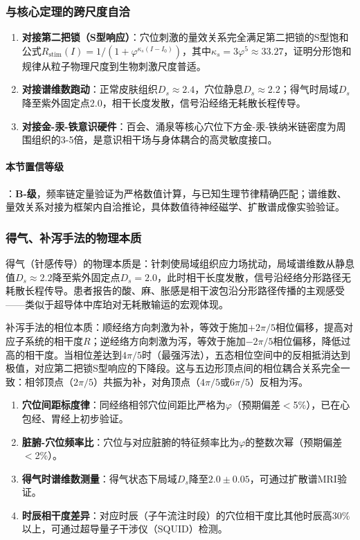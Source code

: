 \documentclass[12pt,a4paper,twocolumn]{article}
\renewcommand{\phi}{\varphi}
\begin{document}
\subsubsection{与核心定理的跨尺度自洽}
\begin{enumerate}
\item \textbf{对接第二把锁（S型响应）}：穴位刺激的量效关系完全满足第二把锁的S型饱和公式$R_{\text{stim}}(I) = 1/(1+\phi^{\kappa_s(I-I_0)})$，其中$\kappa_s=3\phi^5\approx33.27$，证明分形饱和规律从粒子物理尺度到生物刺激尺度普适。
\item \textbf{对接谱维数跑动}：正常皮肤组织$D_s\approx2.4$，穴位静息$D_s\approx2.2$；得气时局域$D_s$降至紫外固定点2.0，相干长度发散，信号沿经络无耗散长程传导。
\item \textbf{对接金-汞-铁意识硬件}：百会、涌泉等核心穴位下方金-汞-铁纳米链密度为周围组织的3-5倍，是意识相干场与身体耦合的高灵敏度接口。
\end{enumerate}

\paragraph{本节置信等级}：\textbf{B-级}，频率链定量验证为严格数值计算，与已知生理节律精确匹配；谱维数、量效关系对接为框架内自洽推论，具体数值待神经磁学、扩散谱成像实验验证。

\subsubsection{得气、补泻手法的物理本质}
\label{subsec:deqi_reinforcement}
得气（针感传导）的物理本质是：针刺使局域组织应力场扰动，局域谱维数从静息值$D_s\approx2.2$降至紫外固定点$D_s=2.0$，此时相干长度发散，信号沿经络分形路径无耗散长程传导。患者报告的酸、麻、胀感是相干波包沿分形路径传播的主观感受——类似于超导体中库珀对无耗散输运的宏观体现。

补泻手法的相位本质：顺经络方向刺激为补，等效于施加$+2\pi/5$相位偏移，提高对应子系统的相干度$R$；逆经络方向刺激为泻，等效于施加$-2\pi/5$相位偏移，降低过高的相干度。当相位差达到$4\pi/5$时（最强泻法），五态相位空间中的反相抵消达到极值，对应第二把锁S型响应的下降段。这与五边形顶点间的相位耦合关系完全一致：相邻顶点（$2\pi/5$）共振为补，对角顶点（$4\pi/5$或$6\pi/5$）反相为泻。

\begin{enumerate}
\item \textbf{穴位间距标度律}：同经络相邻穴位间距比严格为$\phi$（预期偏差$<$5\%），已在心包经、胃经上初步验证。
\item \textbf{脏腑-穴位频率比}：穴位与对应脏腑的特征频率比为$\phi$的整数次幂（预期偏差$<$2\%）。
\item \textbf{得气时谱维数测量}：得气状态下局域$D_s$降至$2.0\pm0.05$，可通过扩散谱MRI验证。
\item \textbf{时辰相干度差异}：对应时辰（子午流注时段）的穴位相干度比其他时辰高30\%以上，可通过超导量子干涉仪（SQUID）检测。
\end{enumerate}
\end{document}
